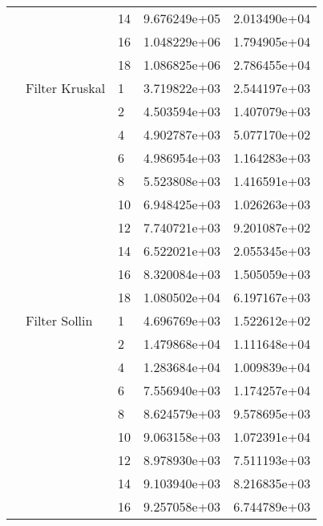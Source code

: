 \begin{tabular}{lllrr}
                      &                     & 14 &  9.676249e+05 &  2.013490e+04 \\
                      &                     & 16 &  1.048229e+06 &  1.794905e+04 \\
                      &                     & 18 &  1.086825e+06 &  2.786455e+04 \\
                      & Filter Kruskal & 1  &  3.719822e+03 &  2.544197e+03 \\
                      &                     & 2  &  4.503594e+03 &  1.407079e+03 \\
                      &                     & 4  &  4.902787e+03 &  5.077170e+02 \\
                      &                     & 6  &  4.986954e+03 &  1.164283e+03 \\
                      &                     & 8  &  5.523808e+03 &  1.416591e+03 \\
                      &                     & 10 &  6.948425e+03 &  1.026263e+03 \\
                      &                     & 12 &  7.740721e+03 &  9.201087e+02 \\
                      &                     & 14 &  6.522021e+03 &  2.055345e+03 \\
                      &                     & 16 &  8.320084e+03 &  1.505059e+03 \\
                      &                     & 18 &  1.080502e+04 &  6.197167e+03 \\
                      & Filter Sollin & 1  &  4.696769e+03 &  1.522612e+02 \\
                      &                     & 2  &  1.479868e+04 &  1.111648e+04 \\
                      &                     & 4  &  1.283684e+04 &  1.009839e+04 \\
                      &                     & 6  &  7.556940e+03 &  1.174257e+04 \\
                      &                     & 8  &  8.624579e+03 &  9.578695e+03 \\
                      &                     & 10 &  9.063158e+03 &  1.072391e+04 \\
                      &                     & 12 &  8.978930e+03 &  7.511193e+03 \\
                      &                     & 14 &  9.103940e+03 &  8.216835e+03 \\
                      &                     & 16 &  9.257058e+03 &  6.744789e+03 \\

\end{tabular}
